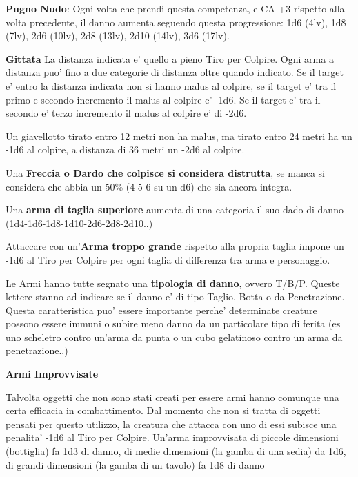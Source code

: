 \documentclass[a4paper,11pt,twoside,openany]{book}
\begin{document}
{		
		
		\textbf{Pugno Nudo}: Ogni volta che prendi questa competenza, e CA +3 rispetto alla volta precedente, il danno aumenta seguendo questa progressione: 1d6 (4lv), 1d8 (7lv), 2d6 (10lv), 2d8 (13lv), 2d10 (14lv), 3d6 (17lv). 
		
		\bigskip
		
		\textbf{Gittata}
		La distanza indicata e' quello a pieno Tiro per Colpire. Ogni arma a distanza puo' fino a due categorie di distanza oltre quando indicato. Se il target e' entro la distanza indicata non si hanno malus al colpire, se il target e' tra il primo e secondo incremento il malus al colpire e' -1d6. Se il target e' tra il secondo e' terzo incremento il malus al colpire e' di -2d6.
		
		Un giavellotto tirato entro 12 metri non ha malus, ma tirato entro 24 metri ha un -1d6 al colpire, a distanza di 36 metri un -2d6 al colpire.
		
		\medskip
		
		
		Una \textbf{Freccia o Dardo che colpisce si considera distrutta}, se manca si considera che abbia un 50\% (4-5-6 su un d6) che sia ancora integra.
		
		\medskip
		
		Una \textbf{arma di taglia superiore} aumenta di una categoria il suo dado di danno (1d4-1d6-1d8-1d10-2d6-2d8-2d10..)
		
		\medskip
		
		Attaccare con un'\textbf{Arma troppo grande} rispetto alla propria taglia impone un -1d6 al Tiro per Colpire per ogni taglia di differenza tra arma e personaggio.
		
		\medskip
		
		Le Armi hanno tutte segnato una \textbf{tipologia di danno}, ovvero T/B/P. 	Queste lettere stanno ad indicare se il danno e' di tipo Taglio, Botta 	o da Penetrazione. Questa caratteristica puo' essere importante perche' 	determinate creature possono essere immuni o subire meno danno da 	un particolare tipo di ferita (es uno scheletro contro un'arma da 	punta o un cubo gelatinoso contro un arma da penetrazione..)
		
		\medskip
		
		\textbf{Armi Improvvisate}
		
		Talvolta oggetti che non sono stati creati per essere armi hanno comunque una certa efficacia in combattimento. Dal momento che non si tratta di oggetti pensati per questo utilizzo, la creatura che attacca con uno di essi subisce una penalita' -1d6 al Tiro per Colpire. Un'arma improvvisata di piccole dimensioni (bottiglia) fa 1d3 di danno, di medie dimensioni (la gamba di una sedia) da 1d6, di grandi dimensioni (la gamba di un tavolo) fa 1d8 di danno
		
}
\end{document}
